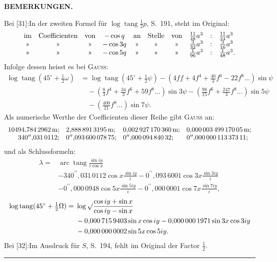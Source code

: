 \par\clearpage
\noindent{}\hfill{\small\textbf{BEMERKUNGEN.}}\hfill\null\par\medskip

{\small
\noindent Bei [31]:\quad In der zweiten Formel für \(\log\operatorname{tang}\tfrac12 p\), S.\ 191, steht im Original:
\[
\begin{array}{cccc@{\quad}ccc@{\quad}rcl}
\text{im}&\text{Coefficienten}&\text{von}&-\cos q&
 \text{an}&\text{Stelle}&\text{von}&\tfrac{11}{48}a^3&:&\tfrac{11}{24}a^3\\
\text{»}&\text{»}&\text{»}&-\cos3q&
 \text{»}&\text{»}&\text{»}&\tfrac3{32}a^3&:&\tfrac3{16}a^3\\
\text{»}&\text{»}&\text{»}&-\cos5q&
 \text{»}&\text{»}&\text{»}&\tfrac1{96}a^3&:&\tfrac1{48}a^3.
\end{array}
\]
\noindent Infolge dessen heisst es bei \textsc{Gauss}:
\[
\begin{aligned}
\log\operatorname{tang}(45^\circ+\tfrac12\omega)
 &=\log\operatorname{tang}(45^\circ+\tfrac12\psi)
 -\left(4ff+4f^4+\frac{40}3f^6-22f^8\ldots\right)\sin\psi\\
 &\quad-\left(\frac83f^4+\frac{34}3f^6+59f^8\ldots\right)\sin3\psi
 -\left(\frac{98}{15}f^6+\frac{247}3f^8\ldots\right)\sin5\psi\\
 &\quad-\left(\frac{400}{21}f^8\ldots\right)\sin7\psi.
\end{aligned}
\]
\noindent Als numerische Werthe der Coefficienten dieser Reihe gibt \textsc{Gauss} an:
\[
\begin{array}{r@{\quad}l@{\quad}l@{\quad}l}
10494{,}784\,2962\,\mathrm m;&2{,}888\,891\,3195\,\mathrm m;&
0{,}002\,927\,170\,360\,\mathrm m;&0{,}000\,003\,499\,170\,05\,\mathrm m;\\
340^{\prime\prime}{,}031\,0112;&0^{\prime\prime}{,}093\,600\,078\,75;&
0^{\prime\prime}{,}000\,094\,840\,32;&0^{\prime\prime}{,}000\,000\,113\,373\,11;
\end{array}
\]
\noindent und als Schlussformeln:
\[
\begin{aligned}
\lambda={}&\operatorname{arc}\operatorname{tang}\frac{\sin iy}{i\cos x}\\
&-340^{\prime\prime}{,}031\,0112\cos x\frac{\sin iy}{i}
 -0^{\prime\prime}{,}093\,6001\cos3x\frac{\sin3iy}{i}\\
&-0^{\prime\prime}{,}000\,0948\cos5x\frac{\sin5iy}{i}
 -0^{\prime\prime}{,}000\,0001\cos7x\frac{\sin7iy}{i},
\end{aligned}
\]
\[
\begin{aligned}
\log\operatorname{tang}(45^\circ+\tfrac12\Omega)
={}&\log\surd\frac{\cos iy+\sin x}{\cos iy-\sin x}\\
&-0{,}000\,715\,9403\sin x\cos iy
 -0{,}000\,000\,1971\sin3x\cos3iy\\
&-0{,}000\,000\,0002\sin5x\cos5iy.
\end{aligned}
\]
\noindent Bei [32]:\quad Im Ausdruck für \(S\), S.\ 194, fehlt im Original der Factor \(\tfrac12\).
\begin{center}\rule{.24\linewidth}{.4pt}\end{center}

}
